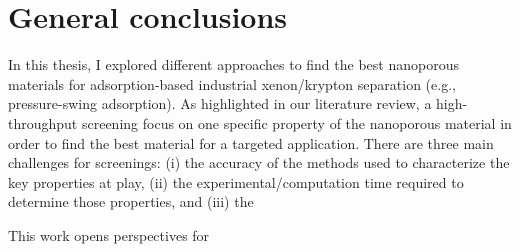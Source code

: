
\chapter*{General conclusions}

In this thesis, I explored different approaches to find the best nanoporous materials for adsorption-based industrial xenon/krypton separation (e.g., pressure-swing adsorption). As highlighted in our literature review, a high-throughput screening focus on one specific property of the nanoporous material in order to find the best material for a targeted application. There are three main challenges for screenings: (i) the accuracy of the methods used to characterize the key properties at play, (ii) the experimental/computation time required to determine those properties, and (iii) the 

 
\begin{center}
\end{center}

This work opens perspectives for 

\vfill
\begin{center}
\end{center}
\vfill\vfill
